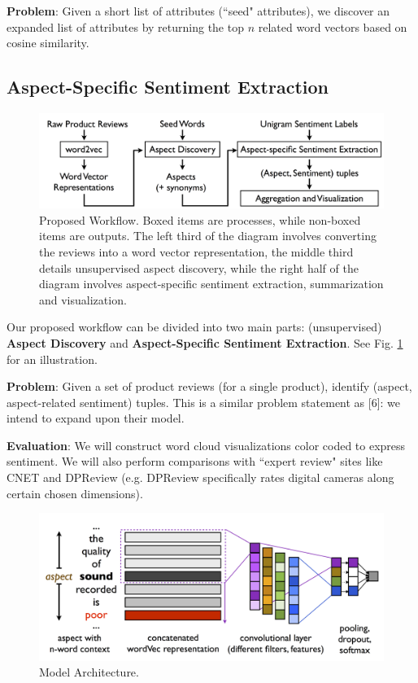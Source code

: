 \documentclass{article} %
\begin{document}
\textbf{Problem}: Given a short list of attributes (``seed" attributes), we discover an expanded list of attributes by returning the top $n$ related word vectors based on cosine similarity.



\subsection{Aspect-Specific Sentiment Extraction}



\begin{figure}[ht]
\begin{center}
\includegraphics[width=.85\columnwidth]{workflow.png}
\end{center}
\caption{Proposed Workflow. Boxed items are processes, while non-boxed items are outputs. The left third of the diagram involves converting the reviews into a word vector representation, the middle third details unsupervised aspect discovery, while the right half of the diagram involves aspect-specific sentiment extraction, summarization and visualization.}%
\label{workflow}
\end{figure}

Our proposed workflow can be divided into two main parts: (unsupervised) {\bf Aspect Discovery} and {\bf Aspect-Specific Sentiment Extraction}. See Fig. \ref{workflow} for an illustration.

\textbf{Problem}: Given a set of product reviews (for a single product), identify (aspect, aspect-related sentiment) tuples. This is a similar problem statement as [6]: we intend to expand upon their model.

\textbf{Evaluation}: We will construct word cloud visualizations color coded to express sentiment. We will also perform comparisons with ``expert review" sites like CNET and DPReview (e.g. DPReview specifically rates digital cameras along certain chosen dimensions).

\begin{figure}[ht]
\begin{center}
\includegraphics[width=.85\columnwidth]{model_architecture.png}
\end{center}
\caption{Model Architecture.}
\label{architecture}
\end{figure}
\end{document}
